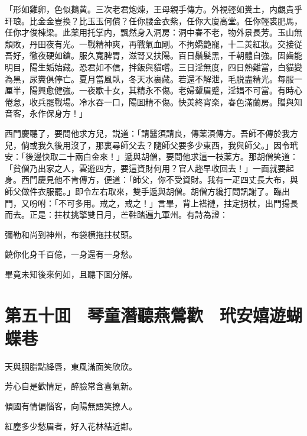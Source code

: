 「形如雞卵，色似鵝黄。三次老君炮煉，王母親手傳方。外視輕如糞土，内覷貴乎玕琅。比金金豈換？比玉玉何償？任你腰金衣紫，任你大廈高堂。任你輕裘肥馬，任你才俊棟梁。此薬用托掌内，飄然身入洞房：洞中春不老，物外景長芳。玉山無頽敗，丹田夜有光。一戰精神爽，再戰氣血剛。不拘嬌艷寵，十二羙紅妝。交接従吾好，徹夜硬如鎗。服久寬脾胃，滋腎又扶陽。百日鬚髮黑，千朝體自強。固齒能明目，陽生姤始藏。恐君如不信，拌飯與貓嚐。三日淫無度，四日熱難當，白貓變為黑，尿糞俱停亡。夏月當風臥，冬天水裏藏。若還不解泄，毛脱盡精光。每服一厘半，陽興愈健強。一夜歇十女，其精永不傷。老婦顰眉蹙，淫娼不可當。有時心倦怠，收兵罷戰場。冷水吞一口，陽囬精不傷。快羙終宵楽，春色滿蘭房。贈與知音客，永作保身方！」

西門慶聽了，要問他求方兒，説道：「請醫須請良，傳薬湏傳方。吾師不傳於我方兒，倘或我久後用沒了，那裏尋師父去？隨師父要多少東西，我與師父。」因令玳安：「後邊快取二十兩白金來！」遞與胡僧，要問他求這一枝薬方。那胡僧笑道：「貧僧乃出家之人，雲遊四方，要這資財何用？官人趂早收回去！」一面就要起身。西門慶見他不肯傳方，便道：「師父，你不受資財。我有一疋四丈長大布，與師父做件衣服罷。」即令左右取來，雙手遞與胡僧。胡僧方纔打問訊謝了。臨出門，又吩咐：「不可多用。戒之，戒之！」言畢，背上褡褳，拄定拐杖，出門揚長而去。正是：拄杖挑擎雙日月，芒鞋踏遍九軍州。有詩為證：

彌勒和尚到神州，布袋横拖拄杖頭。

饒你化身千百億，一身還有一身愁。

畢竟未知後來何如，且聽下囬分解。

\chapter*{第五十囬　琴童潛聽燕鶯歡　玳安嬉遊蝴蝶巷}

天與胭脂點絳唇，東風滿面笑欣欣。

芳心自是歡情足，醉臉常含喜氣新。

傾國有情偏惱客，向陽無語笑撩人。

紅塵多少愁眉者，好入花林結近鄰。

